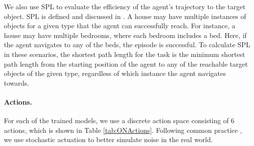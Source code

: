 We also use SPL to evaluate the efficiency of the agent's trajectory to the target object. SPL is defined and discussed in \cite{Anderson2018OnEO, batra2020objectnav}. A house may have multiple instances of objects for a given type that the agent can successfully reach. For instance, a house may have multiple bedrooms, where each bedroom includes a bed. Here, if the agent navigates to any of the beds, the episode is successful. To calculate SPL in these scenarios, the shortest path length for the task is the minimum shortest path length from the starting position of the agent to any of the reachable target objects of the given type, regardless of which instance the agent navigates towards.

\paragraph{Actions.}
For each of the trained models, we use a discrete action space consisting of 6 actions, which is shown in Table \ref{tab:ONActions}. Following common practice \cite{Deitke2020RoboTHORAO, kadian2020sim2real}, we use stochastic actuation to better simulate noise in the real world.


